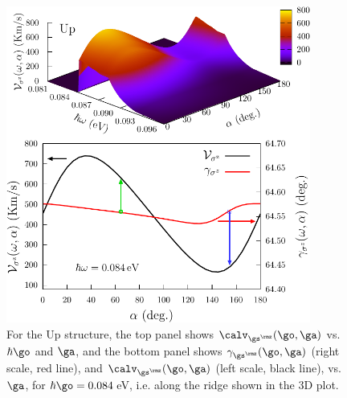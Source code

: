 \documentclass[floatfix,prb,aps,superscriptaddress,showpacs,11pt,preprint,letterpaper]{revtex4}
\def\tama{10cm}
\begin{document}
\begin{figure}[t]
\centering
\includegraphics[width=\tama]{upplots/up-vsz-w1}
\caption{For the Up structure, the top panel shows 
$\calv_{\gs^\rmz}(\go,\ga)$ vs. $\hbar\go$ and $\ga$, and the bottom panel
shows $\gamma_{\gs^\rmz}(\go,\ga)$ (right scale, red line), and
$\calv_{\gs^\rmz}(\go,\ga)$ (left scale, black line), vs. $\ga$, for
$\hbar\go=0.084$\,eV, i.e. along the ridge shown in the 3D plot. }
\label{fig:up-vsz-w1}
\end{figure}
\end{document}
